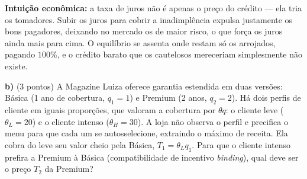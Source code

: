 \begin{solucao}
\textbf{Intui\c{c}\~ao econ\^omica:} a taxa de juros n\~ao \'e apenas o pre\c{c}o do cr\'edito --- ela tria os tomadores. Subir os juros para cobrir a inadimpl\^encia expulsa justamente os bons pagadores, deixando no mercado os de maior risco, o que for\c{c}a os juros ainda mais para cima. O equil\'ibrio se assenta onde restam s\'o os arrojados, pagando $100\%$, e o cr\'edito barato que os cautelosos mereceriam simplesmente n\~ao existe.
\end{solucao}

\textbf{b)} (3 pontos) A Magazine Luiza oferece garantia estendida em duas vers\~oes: B\'asica (1 ano de cobertura, $q_1=1$) e Premium (2 anos, $q_2=2$). H\'a dois perfis de cliente em iguais propor\c{c}\~oes, que valoram a cobertura por $\theta q$: o cliente leve ($\theta_L=20$) e o cliente intenso ($\theta_H=30$). A loja n\~ao observa o perfil e precifica o menu para que cada um se autosselecione, extraindo o m\'aximo de receita. Ela cobra do leve seu valor cheio pela B\'asica, $T_1=\theta_L q_1$. Para que o cliente intenso prefira a Premium \`a B\'asica (compatibilidade de incentivo \emph{binding}), qual deve ser o pre\c{c}o $T_2$ da Premium?

